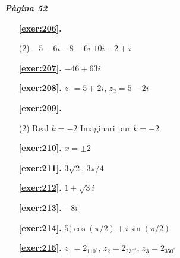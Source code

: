 
\hyperlink{page.52}{\textbf{\em Pàgina 52}}
\begin{enumerate}



 \item[\fontfamily{phv}\selectfont\color{blue}\textbf{\ref{exer:206}. }] \label{ans:206}
 \begin{tasks}[column-sep=1em, item-indent=1.3333em](2)
	 \task $-5-6i$
	 \task $-8-6i$
	 \task $10i$
	 \task $-2+i$
\end{tasks}
 \end{enumerate}
\begin{enumerate}
\item[\fontfamily{phv}\selectfont\color{blue}\textbf{\ref{exer:207}. }] \label{ans:207} 
$-46+63i$
\item[\fontfamily{phv}\selectfont\color{blue}\textbf{\ref{exer:208}. }] \label{ans:208} 
$z_1=5+2i$, $z_2=5-2i$



 \item[\fontfamily{phv}\selectfont\color{blue}\textbf{\ref{exer:209}. }] \label{ans:209}
 \begin{tasks}[column-sep=1em, item-indent=1.3333em](2)
	 \task Real $k=-2$
	 \task Imaginari pur $k=-2$
\end{tasks}
\item[\fontfamily{phv}\selectfont\color{blue}\textbf{\ref{exer:210}. }] \label{ans:210} 
$x=\pm 2$
\item[\fontfamily{phv}\selectfont\color{blue}\textbf{\ref{exer:211}. }] \label{ans:211} 
$3\sqrt {2}$, $3\pi /4$
\item[\fontfamily{phv}\selectfont\color{blue}\textbf{\ref{exer:212}. }] \label{ans:212} 
$1+\sqrt {3}i$
\item[\fontfamily{phv}\selectfont\color{blue}\textbf{\ref{exer:213}. }] \label{ans:213} 
$-8i$
\item[\fontfamily{phv}\selectfont\color{blue}\textbf{\ref{exer:214}. }] \label{ans:214} 
$5(\cos (\pi /2) +i \sin (\pi /2)$
\item[\fontfamily{phv}\selectfont\color{blue}\textbf{\ref{exer:215}. }] \label{ans:215} 
$z_1=2_{110^\circ }$, $z_2=2_{230^\circ }$, $z_3=2_{350^\circ }$
 \end{enumerate}

